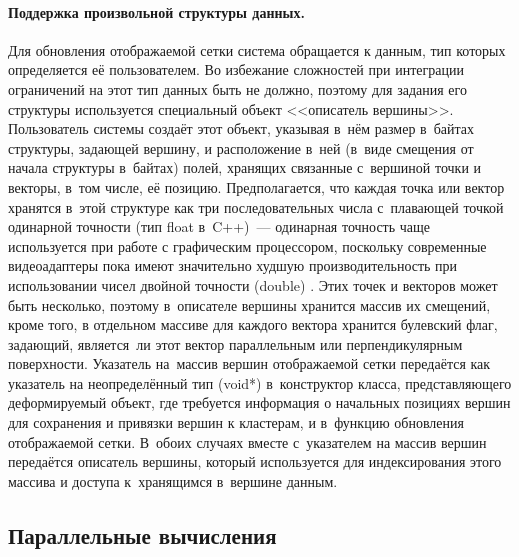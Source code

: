 \documentclass[a4paper, 14pt, titlepage]{extarticle}
\begin{document}
        \paragraph{Поддержка произвольной структуры данных.}
        Для обновления отображаемой сетки система обращается к данным, тип которых
        определяется её пользователем. Во избежание сложностей при интеграции ограничений на этот
        тип данных быть не должно, поэтому для задания его структуры
        используется специальный объект <<описатель вершины>>. Пользователь системы создаёт этот
        объект, указывая в~нём размер в~байтах структуры, задающей вершину, и расположение в~ней
        (в~виде смещения от начала структуры в~байтах) полей, хранящих связанные с~вершиной точки и
        векторы, в~том числе, её позицию.  Предполагается, что каждая точка или вектор хранятся
        в~этой структуре как три последовательных числа с~плавающей точкой одинарной точности (тип
        float в~C++)~--- одинарная точность чаще используется при работе с графическим процессором,
        поскольку современные видеоадаптеры пока имеют значительно худшую производительность
        при использовании чисел двойной точности (double) \cite{gpu-float}. Этих точек и
        векторов может быть несколько, поэтому в~описателе вершины хранится массив их смещений,
        кроме того, в отдельном массиве для каждого вектора хранится булевский флаг, задающий,
        является~ли этот вектор параллельным или перпендикулярным поверхности. Указатель на~массив
        вершин отображаемой сетки передаётся как указатель на неопределённый тип (void*)
        в~конструктор класса, представляющего деформируемый объект, где требуется информация о
        начальных позициях вершин для сохранения и привязки вершин к кластерам, и в~функцию
        обновления отображаемой сетки. В~обоих случаях вместе с~указателем на массив вершин
        передаётся описатель вершины, который используется для индексирования этого массива и
        доступа к~хранящимся в~вершине данным.

    \subsection{Параллельные вычисления}\label{ssec:parallel}
\end{document}
